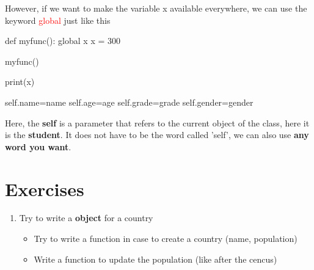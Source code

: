 \documentclass[12pt]{article}
\begin{document}
However, if we want to make the variable x available everywhere, we can use the keyword \textcolor{red}{global} just like this
\begin{python}
def myfunc():
  global x
  x = 300

myfunc()

print(x)
\end{python}
\begin{python}
  self.name=name	
	self.age=age
	self.grade=grade
	self.gender=gender
\end{python}
\par Here, the \textbf{self} is a parameter that refers to the current object of the class, here it is the \textbf{student}. It does not have to be the word called 'self', we can also use \textbf{any word you want}.
\section{Exercises}
\begin{enumerate}
	\item Try to write a \textbf{object} for a country
		\begin{itemize}
			\item Try to write a function in case to create a country (name, population)
			\item Write a function to update the population (like after the cencus)
		\end{itemize}
\end{enumerate}
\newpage
\newpage
\printbibliography
\end{document}
